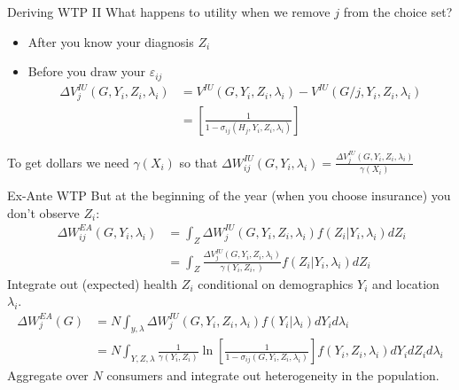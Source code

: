 \documentclass[aspectratio=169,10pt]{beamer}
\begin{document}
\begin{frame}{Deriving WTP II}
What happens to utility when we remove $j$ from the choice set?
\begin{itemize}
\item \alert{After} you know your diagnosis $Z_i$
\item \alert{Before} you draw your $\varepsilon_{ij}$
\begin{align*}\Delta V_{j}^{I U}\left(G, Y_{i}, Z_{i}, \lambda_{i}\right)  &=V^{I U}\left(G, Y_{i}, Z_{i}, \lambda_{i}\right)-V^{I U}\left(G / j, Y_{i}, Z_{i}, \lambda_{i}\right) \\
&=\left[\frac{1}{1-\sigma_{ij}\left(H_{j}, Y_{i}, Z_{i}, \lambda_{i}\right)}\right]
\end{align*}
\end{itemize}
To get dollars we need $\gamma(X_i)$ so that $\Delta W_{ij}^{IU}(G,Y_i,\lambda_i) = \frac{\Delta V_{j}^{I U}\left(G, Y_{i}, Z_{i}, \lambda_{i}\right) }{\gamma(X_i)}$
\end{frame}

\begin{frame}{Ex-Ante WTP}
But at the beginning of the year (when you choose insurance) you don't observe $Z_i$:
\begin{align*}
\ \Delta W_{i j}^{E A}\left(G, Y_{i}, \lambda_{i}\right) &=\int_{Z} \Delta W_{j}^{I U}\left(G, Y_{i}, Z_{i}, \lambda_{i}\right) f\left(Z_{i} | Y_{i}, \lambda_{i}\right) d Z_{i} \\
 &=\int_{Z} \frac{\Delta V_{j}^{I U}\left(G, Y_{i}, Z_{i}, \lambda_{i}\right)}{\gamma\left(Y_{i}, Z_{i},\right)} f\left(Z_{i} | Y_{i}, \lambda_{i}\right) d Z_{i} 
 \end{align*}
 Integrate out (expected) health $Z_i$ conditional on demographics $Y_i$ and location $\lambda_i$.
\begin{align*}
 \Delta W_{j}^{E A}(G) &=N \int_{y, \lambda} \Delta W_{j}^{I U}\left(G, Y_{i}, Z_{i}, \lambda_{i}\right) f\left(Y_{i} | \lambda_{i}\right) d Y_{i} d \lambda_{i} \\ &=N \int_{Y, Z, \lambda} \frac{1}{\gamma\left(Y_{i}, Z_{i}\right)} \ln \left[\frac{1}{1-\sigma_{ij}\left(G, Y_{i}, Z_{i}, \lambda_{i}\right)}\right] f\left(Y_{i}, Z_{i}, \lambda_{i}\right) d Y_{i} d Z_{i} d \lambda_{i}
\end{align*}
Aggregate over $N$ consumers and integrate out heterogeneity in the population.
\end{frame}
\end{document}
